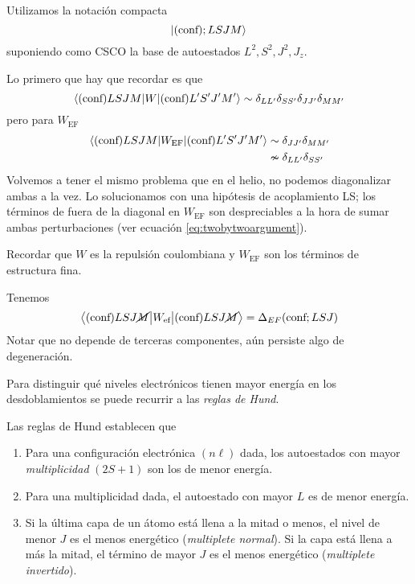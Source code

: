 Utilizamos la notación compacta
\begin{equation}
  \ket{ (\text{conf}) ; L S J M}
\end{equation}
suponiendo como CSCO la base de autoestados $L^2,S^2,J^2,J_z$.

Lo primero que hay que recordar es que
\begin{equation}
  \mel{(\text{conf})LSJM}{W}{(\text{conf})L'S'J'M'} \sim
  \delta_{LL'}\delta_{SS'}\delta_{JJ'}\delta_{MM'}
\end{equation}
pero para $W_\text{EF}$
\begin{equation}
  \begin{split}
    \mel{(\text{conf})LSJM}{W_\text{EF}}{(\text{conf})L'S'J'M'} & \sim
    \delta_{JJ'} \delta_{MM'} \\
    & \nsim \delta_{LL'}\delta_{SS'}
  \end{split}
\end{equation}
Volvemos a tener el mismo problema que en el helio, no podemos
diagonalizar ambas a la vez.
Lo solucionamos con una hipótesis de acoplamiento LS; los términos de
fuera de la diagonal en $W_\text{EF}$ son despreciables a la hora de
sumar ambas perturbaciones (ver ecuación \eqref{eq:twobytwoargument}).

Recordar que $W$ es la repulsión coulombiana y $W_\text{EF}$ son los
términos de estructura fina. 

Tenemos
\begin{equation}
  \ev{W_\text{ef}}{(\text{conf})LSJ\cancel{M}} = \Delta_{EF}(\text{conf};LSJ)
\end{equation}
Notar que no depende de terceras componentes, aún persiste algo de
degeneración.

Para distinguir qué niveles electrónicos tienen mayor energía en los
desdoblamientos se puede recurrir a las \emph{reglas de Hund}.

\begin{regla*} Las reglas de Hund establecen que


\begin{enumerate}
\item Para una configuración electrónica $(n\ell)$ dada, los autoestados
  con mayor \emph{multiplicidad} $(2S+1)$ son los de menor energía.
\item Para una multiplicidad dada, el autoestado con mayor $L$ es de
  menor energía.
\item Si la última capa de un átomo está llena a la mitad o menos, el
  nivel de menor $J$ es el menos energético (\emph{multiplete
    normal}). Si la capa está llena a más la mitad, el término de
  mayor $J$ es el menos energético (\emph{multiplete invertido}). 
\end{enumerate}
\end{regla*}

